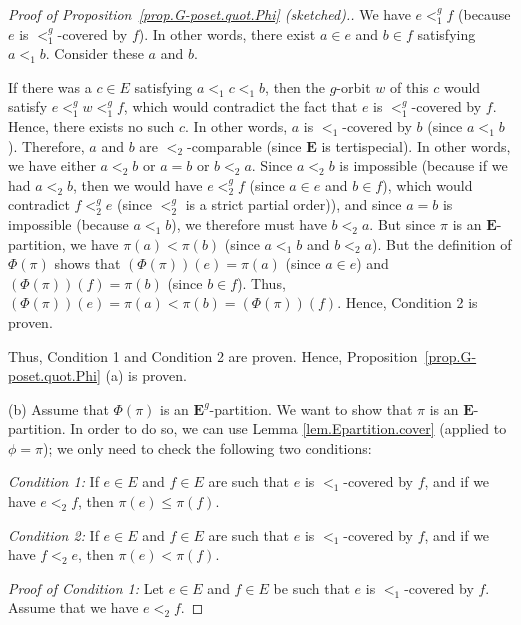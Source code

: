 \documentclass[12pt]{article}
\theoremstyle{plain}
\theoremstyle{definition}
\theoremstyle{remark}
\newcommand{\EE}{{\mathbf{E}}}
\begin{document}
\begin{proof}[Proof of Proposition~\ref{prop.G-poset.quot.Phi} (sketched).]
We have $e<_{1}^{g}f$ (because $e$ is $<_{1}^{g}$-covered by $f$). In other
words, there exist $a\in e$ and $b\in f$ satisfying $a<_{1}b$. Consider these
$a$ and $b$.


If there was a $c \in E$ satisfying $a <_1 c <_1 b$, then
the $g$-orbit $w$ of this $c$ would satisfy
$e <_1^g w <_1^g f$, which would contradict the fact that $e$ is
$<_1^g$-covered by $f$. Hence, there exists no such $c$.
In other words, $a$ is $<_{1}$-covered by $b$ (since $a<_{1}b$). Therefore,
$a$ and $b$ are $<_{2}$-comparable (since $\EE$ is tertispecial). In
other words, we have either $a<_{2}b$ or $a=b$ or $b<_{2}a$. Since $a<_{2}b$
is impossible (because if we had $a<_{2}b$, then we would have $e<_{2}^{g}f$
(since $a\in e$ and $b\in f$), which would contradict $f<_{2}^{g}e$ (since
$<_{2}^{g}$ is a strict partial order)), and since $a=b$ is
impossible (because $a<_{1}b$), we therefore must have $b<_{2}a$. But since
$\pi$ is an $\EE$-partition, we have $\pi\left(  a\right)  <\pi\left(
b\right)  $ (since $a<_{1}b$ and $b<_{2}a$). But the definition of
$\Phi\left(  \pi\right)  $ shows that $\left(  \Phi\left(  \pi\right)
\right)  \left(  e\right)  =\pi\left(  a\right)  $ (since $a\in e$) and
$\left(  \Phi\left(  \pi\right)  \right)  \left(  f\right)  =\pi\left(
b\right)  $ (since $b\in f$). Thus, $\left(  \Phi\left(  \pi\right)  \right)
\left(  e\right)  =\pi\left(  a\right)  <\pi\left(  b\right)  =\left(
\Phi\left(  \pi\right)  \right)  \left(  f\right)  $. Hence, Condition 2 is proven.

Thus, Condition 1 and Condition 2 are proven. Hence,
Proposition~\ref{prop.G-poset.quot.Phi} (a) is proven.

(b) Assume that $\Phi\left(  \pi\right)  $ is an
$\EE^{g}$-partition. We want to show that $\pi$ is an
$\EE$-partition. In order to do so, we can use
Lemma \ref{lem.Epartition.cover}
(applied to $\phi=\pi$); we only need to check the following two conditions:

\textit{Condition 1:} If $e\in E$ and $f\in E$ are such that $e$ is
$<_{1}$-covered by $f$, and if we have $e<_{2}f$, then
$\pi\left(  e\right)  \leq \pi\left(  f\right)  $.

\textit{Condition 2:} If $e\in E$ and $f\in E$ are such that $e$ is
$<_{1}$-covered by $f$, and if we have $f<_{2}e$, then
$\pi\left(  e\right) <\pi\left(  f\right)  $.

\textit{Proof of Condition 1:} Let $e\in E$ and $f\in E$ be such that $e$ is
$<_{1}$-covered by $f$. Assume that we have $e<_{2}f$.


\end{proof}
\end{document}
